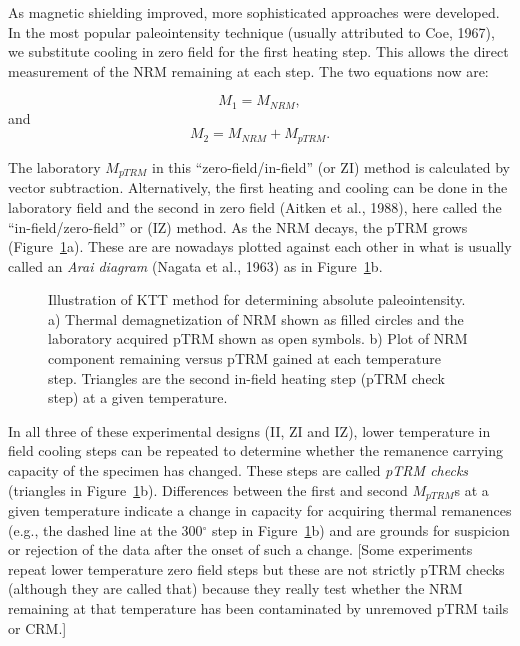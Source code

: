 As magnetic shielding improved,  more sophisticated  approaches were developed.  
In the most popular paleointensity  technique (usually attributed to 
Coe,  1967), \nocite{coe67} we substitute cooling in zero field for the first heating step.  This  allows  the direct measurement of the NRM remaining at each step.   The two equations now are:

$$
 M_1 = M_{NRM},   
$$
\noindent and
$$
 M_2 = M_{NRM} + M_{ pTRM}. 
$$

\noindent  The laboratory  $M_{ pTRM}$ in this ``zero-field/in-field'' (or ZI) method is calculated by  vector subtraction.  Alternatively, the first heating and cooling can be done in the laboratory field and the second in zero field
 (Aitken et al., 1988),  \nocite{aitken88} here called the ``in-field/zero-field'' or (IZ) method.  As the NRM decays, the pTRM grows (Figure~\ref{fig:thellier}a).  These are  
 are nowadays plotted against each other in what is usually called an 
{\it Arai diagram} 
 (Nagata et al.,  1963) \nocite{nagata63} as in Figure~\ref{fig:thellier}b. 


\begin{figure}[htb]
\epsfxsize 15cm
\centering {}
\caption{Illustration of KTT method for determining absolute paleointensity.  a) Thermal demagnetization of NRM shown as filled circles and the laboratory acquired pTRM shown as open symbols.  b) Plot of NRM component remaining versus pTRM gained at each temperature step.  Triangles are the second in-field heating step (pTRM check step) at  a given temperature.   }
\label{fig:thellier}
\end{figure}


In all three of these experimental designs  (II, ZI and IZ),  lower temperature in field cooling steps can be repeated to determine whether the remanence carrying capacity of the specimen has changed.  These steps are called  
{\it pTRM checks}  (triangles in Figure~\ref{fig:thellier}b).   Differences between the first and second  $M_{ pTRM}$s at a given temperature indicate a change in capacity for acquiring thermal remanences (e.g., the dashed line at the 300$^{\circ}$ step in Figure~\ref{fig:thellier}b)  and are grounds for suspicion or rejection of the data after the onset of such a change.  
 [Some experiments repeat lower temperature zero field steps but these are not strictly pTRM checks (although they are called that) because they really test whether the NRM remaining at that temperature has been contaminated by unremoved pTRM tails or CRM.]


